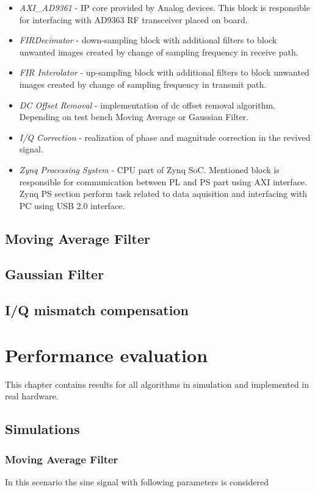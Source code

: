 \documentclass[en,printmode]{mgr}
\begin{document}
	\begin{itemize}
		\item \textit{AXI_AD9361} - IP core provided by Analog devices. This block is responsible for
			interfacing with AD9363 RF transceiver placed on board. 
		\item \textit{FIRDecimator} - down-sampling block with additional filters to block unwanted
			images created by change of sampling frequency in receive path.
		\item \textit{FIR Interolator} - up-sampling block with additional filters to block unwanted
			images created by change of sampling frequency in transmit path.
		\item \textit{DC Offset Removal} - implementation of dc offset removal algorithm. 
			Depending on test bench Moving Average or Gaussian Filter.
		\item \textit{I/Q Correction} - realization of phase and magnitude correction in the revived
		 	signal.
		\item \textit{Zynq Processing System} - CPU part of Zynq SoC. Mentioned block is responsible for
			communication between PL and PS part using AXI interface. Zynq PS section perform task
			related to data aquisition and interfacing with PC using USB 2.0 interface.
	\end{itemize}
	
	\section{Moving Average Filter}
	\section{Gaussian Filter}
	\section{I/Q mismatch compensation}
	
	
	
\chapter{Performance evaluation}
	This chapter contains results for all algorithms in simulation and implemented in real hardware.
	\section{Simulations}
		\subsection*{Moving Average Filter}
			In this scenario the sine signal with following parameters is considered
		
\end{document}

